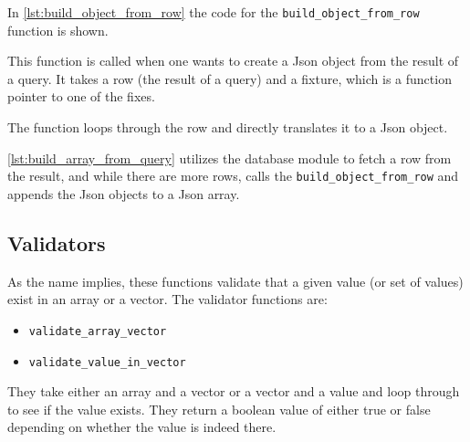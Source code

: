 In \autoref{lst:build_object_from_row} the code for the \lstinline|build_object_from_row| function is shown. 



This function is called when one wants to create a Json object from the result of a query. It takes a row (the result of a query) and a fixture, which is a function pointer to one of the fixes. 

The function loops through the row and directly translates it to a Json object.



\autoref{lst:build_array_from_query} utilizes the database module to fetch a row from the result, and  while there are more rows, calls the \lstinline|build_object_from_row| and appends the Json objects to a Json array.

\subsection{Validators}
As the name implies, these functions validate that a given value (or set of values) exist in an array or a vector. The validator functions are:
\begin{itemize}
\item \lstinline|validate_array_vector|
\item \lstinline|validate_value_in_vector|
\end{itemize}

They take either an array and a vector or a vector and a value and loop through to see if the value exists. They return a boolean value of either true or false depending on whether the value is indeed there.